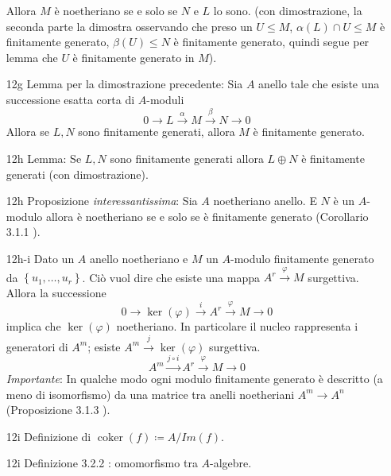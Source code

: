\documentclass[italian]{article}
\begin{document}
\begin{enumerate}
\begin{equation*}
        \end{equation*}
        Allora $M$ è noetheriano se e solo se $N$ e $L$ lo sono.
        (con dimostrazione, la seconda parte la dimostra osservando che preso un
          $U \le M$, $\alpha(L) \cap U \le M$ è finitamente generato,
          $\beta(U) \le N$ è finitamente generato, quindi segue per lemma che $U$ 
          è finitamente generato in $M$).
      \item[12g] Lemma per la dimostrazione precedente: Sia $A$ anello tale che
        esiste una successione esatta corta di $A$-moduli
        \begin{equation*}
          0 \to L \xrightarrow{\alpha} M \xrightarrow{\beta}
            N \to 0
        \end{equation*}
        Allora se $L, N$ sono finitamente generati, allora $M$ è finitamente
        generato.
      \item[12h] Lemma: Se $L,N$ sono finitamente generati allora $L \oplus N$
        è finitamente generati (con dimostrazione).
      \item[12h] Proposizione \emph{interessantissima}: Sia $A$ noetheriano
        anello. E $N$ è un $A$-modulo allora è noetheriano se e solo se
        è finitamente generato (Corollario 3.1.1 \cite{vergura}). 
      \item[12h-i] Dato un $A$ anello noetheriano e $M$ un $A$-modulo finitamente
        generato da $\left\{ u_1, \dots, u_r \right\}$. Ciò vuol dire che esiste
        una mappa $A^r \xrightarrow{\varphi} M$ surgettiva. Allora la
        successione 
        \begin{equation*}
          0 \to \ker(\varphi) \xrightarrow{i} A^r \xrightarrow{\varphi} M \to 0
        \end{equation*}
        implica che $\ker(\varphi)$ noetheriano. In particolare il nucleo
        rappresenta i generatori di $A^m$; esiste $A^m \xrightarrow{j}
        \ker(\varphi)$ surgettiva. 
        \begin{equation*}
          A^m \xrightarrow{j \circ i} A^r \xrightarrow{\varphi} M \to 0
        \end{equation*}
        \emph{Importante}: In qualche modo ogni modulo finitamente generato è 
        descritto (a meno di isomorfismo) da una matrice tra anelli 
        noetheriani $A^m \to A^n$ (Proposizione 3.1.3 \cite{vergura}). 
      \item[12i] Definizione di $\operatorname{coker}(f) \coloneqq A / Im(f)$. 
      \item[12i] Definizione 3.2.2 \cite{vergura}: omomorfismo tra $A$-algebre.

\end{enumerate}
\end{document}
